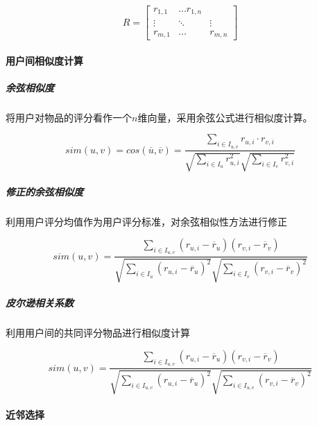\documentclass{upctrans}
\begin{document}
\begin{equation*}
    R=\begin{bmatrix}
        r_{1,1} & \dots r_{1,n}\\
        \vdots & \ddots & \vdots\\
        r_{m,1} & \dots & r_{m,n}
    \end{bmatrix}
\end{equation*}

\paragraph{用户间相似度计算}
\subparagraph{余弦相似度}

将用户对物品的评分看作一个$n$维向量，采用余弦公式进行相似度计算。

\begin{equation*}
    sim(u,v)
    =cos(\overline{u},\overline{v})
    =\frac{\sum\limits_{i\in{I_{u,v}}}r_{u,i}\cdot r_{v,i}}{\sqrt{\sum\limits_{i\in{I_u}}r_{u,i}^2}\sqrt{\sum\limits_{i\in{I_v}}r_{v,i}^2}}
\end{equation*}

\subparagraph{修正的余弦相似度}

利用用户评分均值作为用户评分标准，对余弦相似性方法进行修正

\begin{equation*}
    sim(u,v)=\frac{
        \sum\limits_
        {i\in{I_{u,v}}}
        (r_{u,i}-\overline{r}_u)
        (r_{v,i}-\overline{r}_v)
    }{
        \sqrt{
            \sum\limits_
            {i\in{I_u}}
            (r_{u,i}-\overline{r}_u)^2
        }
        \sqrt{
            \sum\limits_
            {i\in{I_v}}
            (r_{v,i}-\overline{r}_v)^2
        }
    }
\end{equation*}

\subparagraph{皮尔逊相关系数}

利用用户间的共同评分物品进行相似度计算


\begin{equation*}
    sim(u,v)=\frac{
        \sum\limits_
        {i\in{I_{u,v}}}
        (r_{u,i}-\overline{r}_u)
        (r_{v,i}-\overline{r}_v)
    }{
        \sqrt{
            \sum\limits_
            {i\in{I_{u,v}}}
            (r_{u,i}-\overline{r}_u)^2
        }
        \sqrt{
            \sum\limits_
            {i\in{I_{u,v}}}
            (r_{v,i}-\overline{r}_v)^2
        }
    }
\end{equation*}

\paragraph{近邻选择}
\end{document}
